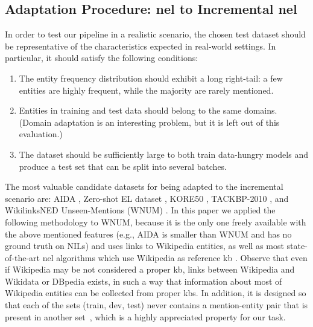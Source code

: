 \subsection{Adaptation Procedure: \ac{nel} to Incremental \ac{nel}}

In order to test our pipeline in a realistic scenario, the chosen test dataset should be representative of the characteristics expected in real-world settings. In particular, it should satisfy the following conditions:  

\begin{enumerate}
    \item The entity frequency distribution should exhibit a long right-tail: a few entities are highly frequent, while the majority are rarely mentioned.  
    \item Entities in training and test data should belong to the same domains. (Domain adaptation is an interesting problem, but it is left out of this evaluation.)  
    \item The dataset should be sufficiently large to both train data-hungry models and produce a test set that can be split into several batches.  
\end{enumerate}


The most valuable candidate datasets for being adapted to the incremental scenario are: AIDA \cite{aida}, Zero-shot EL dataset \cite{logeswaran-etal-2019-zero}, KORE50 \cite{kore50}, TACKBP-2010 \cite{ji2010overview}, and WikilinksNED Unseen-Mentions (WNUM) \cite{Onoe_Durrett_2020}.
In this paper we applied the following methodology to WNUM, because it is the only one freely available with the above mentioned features (e.g., AIDA is smaller than WNUM and has no ground truth on NILs) and uses links to Wikipedia entities, as well as most state-of-the-art \ac{nel} algorithms which use Wikipedia as reference \ac{kb} \cite{blink,decao2021autoregressive,barba-etal-2022-extend}. Observe that even if Wikipedia may be not considered a proper \ac{kb}, links between Wikipedia and Wikidata or DBpedia exists, in such a way that information about most of Wikipedia entities can be collected from proper \acp{kb}. 
In addition, it is designed so that each of the sets (train, dev, test) never contains a mention-entity pair that is present in another set~\cite{Onoe_Durrett_2020}, which is a highly appreciated property for our task.

